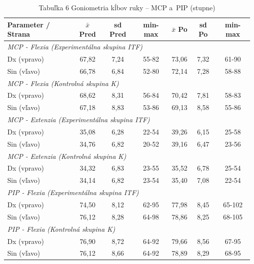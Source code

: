 \begin{table}[H]
\centering
\caption*{Tabuľka 6 Goniometria kĺbov ruky – MCP a~PIP (stupne)}
\begin{tabular}{|l|c|c|c|c|c|c|}
\hline
\textbf{Parameter / Strana} & \textbf{$\bar{x}$ Pred} & \textbf{sd Pred} & \textbf{min-max} & \textbf{$\bar{x}$ Po} & \textbf{sd Po} & \textbf{min-max} \\ \hline
\multicolumn{7}{|l|}{\textit{MCP - Flexia (Experimentálna skupina ITF)}} \\ \hline
Dx (vpravo) & 67,82 & 7,24 & 55-82 & 73,06 & 7,32 & 61-90 \\ \hline
Sin (vľavo) & 66,78 & 6,84 & 52-80 & 72,14 & 7,28 & 58-88 \\ \hline
\multicolumn{7}{|l|}{\textit{MCP - Flexia (Kontrolná skupina K)}} \\ \hline
Dx (vpravo) & 68,62 & 8,31 & 56-84 & 70,42 & 7,81 & 58-83 \\ \hline
Sin (vľavo) & 67,18 & 8,83 & 53-86 & 69,13 & 8,58 & 55-86 \\ \hline
\multicolumn{7}{|l|}{\textit{MCP - Extenzia (Experimentálna skupina ITF)}} \\ \hline
Dx (vpravo) & 35,08 & 6,28 & 22-54 & 39,26 & 6,15 & 25-58 \\ \hline
Sin (vľavo) & 34,76 & 6,82 & 20-52 & 39,16 & 6,47 & 23-56 \\ \hline
\multicolumn{7}{|l|}{\textit{MCP - Extenzia (Kontrolná skupina K)}} \\ \hline
Dx (vpravo) & 34,32 & 6,83 & 23-55 & 35,52 & 6,78 & 25-54 \\ \hline
Sin (vľavo) & 34,14 & 6,82 & 23-54 & 35,40 & 7,08 & 22-54 \\ \hline
\multicolumn{7}{|l|}{\textit{PIP - Flexia (Experimentálna skupina ITF)}} \\ \hline
Dx (vpravo) & 74,50 & 8,12 & 62-95 & 77,98 & 8,45 & 65-102 \\ \hline
Sin (vľavo) & 76,12 & 8,28 & 64-98 & 78,86 & 8,25 & 68-105 \\ \hline
\multicolumn{7}{|l|}{\textit{PIP - Flexia (Kontrolná skupina K)}} \\ \hline
Dx (vpravo) & 76,90 & 8,72 & 64-92 & 79,66 & 8,56 & 67-95 \\ \hline
Sin (vľavo) & 76,12 & 8,66 & 64-92 & 78,89 & 8,29 & 68-95 \\ \hline
\end{tabular}
\end{table}

